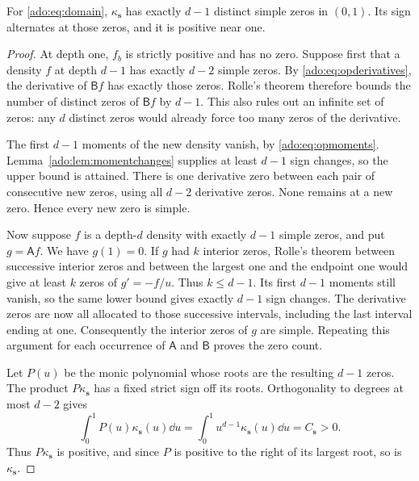 \begin{theorem}
\label{ado:thm:oscillation}
For \eqref{ado:eq:domain}, $\kappa_{\boldsymbol{s}}$ has exactly $d-1$
distinct simple zeros in $(0,1)$. Its sign alternates at those zeros,
and it is positive near one.
\end{theorem}
\begin{proof}
At depth one, $f_b$ is strictly positive and has no zero. Suppose first
that a density $f$ at depth $d-1$ has exactly $d-2$ simple zeros.
By \eqref{ado:eq:opderivatives}, the derivative of $\mathsf{B} f$ has
exactly those zeros. Rolle's theorem therefore bounds the number of
distinct zeros of $\mathsf{B} f$ by $d-1$. This also rules out an infinite
set of zeros: any $d$ distinct zeros would already force too many
zeros of the derivative.

The first $d-1$ moments of the new density vanish, by
\eqref{ado:eq:opmoments}. Lemma~\ref{ado:lem:momentchanges} supplies
at least $d-1$ sign changes, so the upper bound is attained. There is
one derivative zero between each pair of consecutive new zeros, using
all $d-2$ derivative zeros. None remains at a new zero. Hence every
new zero is simple.

Now suppose $f$ is a depth-$d$ density with exactly $d-1$ simple
zeros, and put $g=\mathsf{A} f$. We have $g(1)=0$. If $g$ had $k$
interior zeros, Rolle's theorem between successive interior zeros and
between the largest one and the endpoint one would give at least $k$
zeros of $g'=-f/u$. Thus $k\le d-1$. Its first $d-1$ moments still
vanish, so the same lower bound gives exactly $d-1$ sign changes.
The derivative zeros are now all allocated to those successive
intervals, including the last interval ending at one. Consequently the
interior zeros of $g$ are simple. Repeating this argument for each
occurrence of $\mathsf{A}$ and $\mathsf{B}$ proves the zero count.

Let $P(u)$ be the monic polynomial whose roots are the resulting
$d-1$ zeros. The product $P\kappa_{\boldsymbol{s}}$ has a fixed strict sign
off its roots. Orthogonality to degrees at most $d-2$ gives
\[
 \int_0^1P(u)\kappa_{\boldsymbol{s}}(u)\dd u
 =\int_0^1u^{d-1}\kappa_{\boldsymbol{s}}(u)\dd u=C_{\boldsymbol{s}}>0.
\]
Thus $P\kappa_{\boldsymbol{s}}$ is positive, and since $P$ is positive to
the right of its largest root, so is $\kappa_{\boldsymbol{s}}$.
\end{proof}

